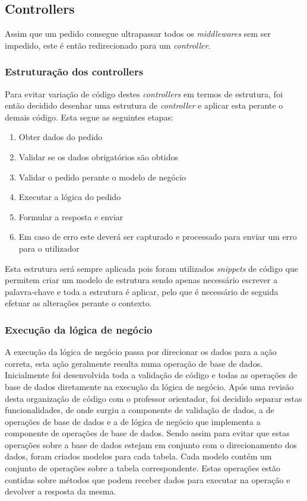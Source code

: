 \subsection{Controllers}
Assim que um pedido consegue ultrapassar todos os \textit{middlewares} sem ser impedido, este é então redirecionado para um \textit{controller}.

\subsubsection{Estruturação dos controllers}
Para evitar variação de código destes \textit{controllers} em termos de estrutura, foi então decidido desenhar uma estrutura de \textit{controller} e aplicar esta perante o demais código. Esta segue as seguintes etapas:
\begin{enumerate}
 \item Obter dados do pedido
 \item Validar se os dados obrigatórios são obtidos
 \item Validar o pedido perante o modelo de negócio
 \item Executar a lógica do pedido
 \item Formular a resposta e enviar
 \item Em caso de erro este deverá ser capturado e processado para enviar um erro para o utilizador
\end{enumerate}

 Esta estrutura será sempre aplicada pois foram utilizados \textit{snippets} de código que permitem criar um modelo de estrutura sendo apenas necessário escrever a palavra-chave e toda a estrutura é aplicar, pelo que é necessário de seguida efetuar as alterações perante o contexto.

\newpage

\subsubsection{Execução da lógica de negócio}
A execução da lógica de negócio passa por direcionar os dados para a ação correta, esta ação geralmente resulta numa operação de base de dados. Inicialmente foi desenvolvida toda a validação de código e todas as operações de base de dados diretamente na execução da lógica de negócio. Após uma revisão desta organização de código com o professor orientador, foi decidido separar estas funcionalidades, de onde surgiu a componente de validação de dados, a de operações de base de dados e a de lógica de negócio que implementa a componente de operações de base de dados. Sendo assim para evitar que estas operações sobre a base de dados estejam em conjunto com o direcionamento dos dados, foram criados modelos para cada tabela. Cada modelo contém um conjunto de operações sobre a tabela correspondente. Estas operações estão contidas sobre métodos que podem receber dados para executar na operação e devolver a resposta da mesma.

